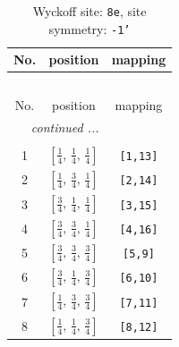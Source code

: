 \documentclass[fleqn,8pt]{jsarticle}
\begin{document}
\renewcommand{\arraystretch}{1.2}
\begin{longtable}{ccc}
\caption{Wyckoff site: {\tt 8e}, site symmetry: {\tt -1'}}
 \\
 \hline \hline
No. & position & mapping \\ \hline \endfirsthead

\multicolumn{2}{l}{\tablename\ \thetable{}} \\
 \hline \hline
No. & position & mapping \\ \hline \endhead

 \hline \hline
\multicolumn{2}{r}{\footnotesize\it continued ...} \\ \endfoot

 \hline \hline
\multicolumn{2}{r}{} \\ \endlastfoot

1 & $\left[ \frac{1}{4},\, \frac{1}{4},\, \frac{1}{4} \right]$ & {\tt [1,13]} \\ \hline
2 & $\left[ \frac{1}{4},\, \frac{3}{4},\, \frac{1}{4} \right]$ & {\tt [2,14]} \\ \hline
3 & $\left[ \frac{3}{4},\, \frac{1}{4},\, \frac{1}{4} \right]$ & {\tt [3,15]} \\ \hline
4 & $\left[ \frac{3}{4},\, \frac{3}{4},\, \frac{1}{4} \right]$ & {\tt [4,16]} \\ \hline
5 & $\left[ \frac{3}{4},\, \frac{3}{4},\, \frac{3}{4} \right]$ & {\tt [5,9]} \\ \hline
6 & $\left[ \frac{3}{4},\, \frac{1}{4},\, \frac{3}{4} \right]$ & {\tt [6,10]} \\ \hline
7 & $\left[ \frac{1}{4},\, \frac{3}{4},\, \frac{3}{4} \right]$ & {\tt [7,11]} \\ \hline
8 & $\left[ \frac{1}{4},\, \frac{1}{4},\, \frac{3}{4} \right]$ & {\tt [8,12]} \\
\end{longtable}
\renewcommand{\arraystretch}{1.2}
\end{document}
